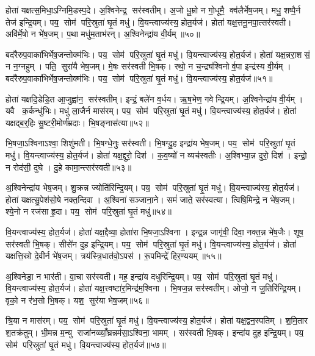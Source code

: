 होता॑ यक्षत्स॒मिधा॒ऽग्निमि॒डस्प॒दे।
अ॒श्विनेन्द्र॒ सर॑स्वतीम्।
अ॒जो धू॒म्रो न गो॒धूमै॒ क्व॑लैर्भेष॒जम्।
मधु॒ शष्पै॒र्न तेज॑ इन्द्रि॒यम्।
पय॒ सोम॑ परि॒स्रुता॑ घृ॒तं मधु॑।
वि॒यन्त्वाज्य॑स्य॒ होत॒र्यज॑।
होता॑ यक्ष॒त्तनू॒नपा॒त्सर॑स्वती।
अवि॑र्मे॒षो न भे॑ष॒जम्।
प॒था मधु॑म॒ताभ॑रन्।
अ॒श्विनेन्द्रा॑य वी॒र्यम्॥५०॥

बद॑रैरुप॒वाका॑भिर्भेष॒जन्तोक्म॑भिः।
पय॒ सोम॑ परि॒स्रुता॑ घृ॒तं मधु॑।
वि॒यन्त्वाज्य॑स्य॒ होत॒र्यज॑।
होता॑ यक्ष॒न्नरा॒शसं॒ न न॒ग्नहुम्।
पति॒ सुरा॑यै भेष॒जम्।
मे॒षः सर॑स्वती भि॒षक्।
रथो॒ न च॒न्द्र्य॑श्विनोर्व॒पा इन्द्र॑स्य वी॒र्यम्।
बद॑रैरुप॒वाका॑भिर्भेष॒जन्तोक्म॑भिः।
पय॒ सोम॑ परि॒स्रुता॑ घृ॒तं मधु॑।
वि॒यन्त्वाज्य॑स्य॒ होत॒र्यज॑॥५१॥

होता॑ यक्षदि॒डेडि॒त आ॒जुह्वा॑न॒ सर॑स्वतीम्।
इन्द्रं॒ बले॑न व॒र्धय\sn{}।
ऋ॒ष॒भेण॒ गवेन्द्रि॒यम्।
अ॒श्विनेन्द्रा॑य वी॒र्यम्।
यवै क॒र्कन्धु॑भिः।
मधु॑ ला॒जैर्न मास॑रम्।
पय॒ सोम॑ परि॒स्रुता॑ घृ॒तं मधु॑।
वि॒यन्त्वाज्य॑स्य॒ होत॒र्यज॑।
होता॑ यक्षद्ब॒र्॒हिः सु॒ष्टरी॒मोर्ण॑म्रदाः।
भि॒षङ्नास॑त्या॥५२॥

भि॒षजा॒ऽश्विनाऽश्वा॒ शिशु॑मती।
भि॒षग्धे॒नुः सर॑स्वती।
भि॒षग्दु॒ह इन्द्रा॑य भेष॒जम्।
पय॒ सोम॑ परि॒स्रुता॑ घृ॒तं मधु॑।
वि॒यन्त्वाज्य॑स्य॒ होत॒र्यज॑।
होता॑ यक्ष॒द्दुरो॒ दिश॑।
क॒व॒ष्यो॑ न व्यच॑स्वतीः।
अ॒श्विभ्या॒न्न दुरो॒ दिश॑।
इन्द्रो॒ न रोद॑सी॒ दुघे।
दु॒हे कामा॒न्त्सर॑स्वती॥५३॥

अ॒श्विनेन्द्रा॑य भेष॒जम्।
शु॒क्रन्न ज्योति॑रिन्द्रि॒यम्।
पय॒ सोम॑ परि॒स्रुता॑ घृ॒तं मधु॑।
वि॒यन्त्वाज्य॑स्य॒ होत॒र्यज॑।
होता॑ यक्षत्सु॒पेश॑सो॒षे नक्त॒न्दिवा।
अ॒श्विना॑ सञ्जाना॒ने।
समं॑ जाते॒ सर॑स्वत्या।
त्विषि॒मिन्द्रे॒ न भे॑ष॒जम्।
श्ये॒नो न रज॑सा हृ॒दा।
पय॒ सोम॑ परि॒स्रुता॑ घृ॒तं मधु॑॥५४॥

वि॒यन्त्वाज्य॑स्य॒ होत॒र्यज॑।
होता॑ यक्ष॒द्दैव्या॒ होता॑रा भि॒षजा॒ऽश्विना।
इन्द्र॒न्न जागृ॑वी॒ दिवा॒ नक्त॒न्न भे॑ष॒जैः।
शूष॒ सर॑स्वती भि॒षक्।
सीसे॑न दुह इन्द्रि॒यम्।
पय॒ सोम॑ परि॒स्रुता॑ घृ॒तं मधु॑।
वि॒यन्त्वाज्य॑स्य॒ होत॒र्यज॑।
होता॑ यक्षत्ति॒स्रो दे॒वीर्न भे॑ष॒जम्।
त्रय॑स्त्रि॒धात॑वो॒ऽपस॑।
रू॒पमिन्द्रे॑ हिर॒ण्ययम्॥५५॥

अ॒श्विनेडा॒ न भार॑ती।
वा॒चा सर॑स्वती।
मह॒ इन्द्रा॑य दधुरिन्द्रि॒यम्।
पय॒ सोम॑ परि॒स्रुता॑ घृ॒तं मधु॑।
वि॒यन्त्वाज्य॑स्य॒ होत॒र्यज॑।
होता॑ यक्ष॒त्त्वष्टा॑र॒मिन्द्र॑म॒श्विना।
भि॒षज॒न्न सर॑स्वतीम्।
ओजो॒ न जू॒तिरि॑न्द्रि॒यम्।
वृको॒ न र॑भ॒सो भि॒षक्।
यश॒ सुर॑या भेष॒जम्॥५६॥

श्रि॒या न मास॑रम्।
पय॒ सोम॑ परि॒स्रुता॑ घृ॒तं मधु॑।
वि॒यन्त्वाज्य॑स्य॒ होत॒र्यज॑।
होता॑ यक्ष॒द्वन॒स्पतिम्।
श॒मि॒तार श॒तक्र॑तुम्।
भी॒मन्न म॒न्यु राजा॑नव्व्याँ॒घ्रन्नम॑सा॒ऽश्विना॒ भामम्।
सर॑स्वती भि॒षक्।
इन्दा॑य दुह इन्द्रि॒यम्।
पय॒ सोम॑ परि॒स्रुता॑ घृ॒तं मधु॑।
वि॒यन्त्वाज्य॑स्य॒ होत॒र्यज॑॥५७॥

